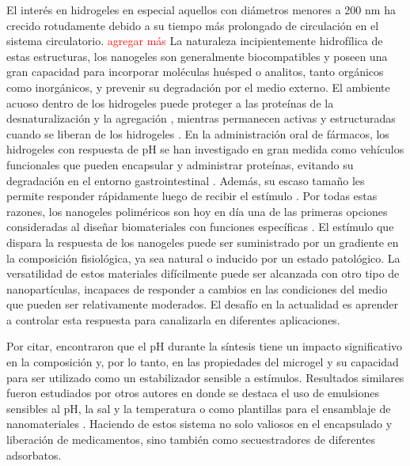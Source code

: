 El inter\'es en hidrogeles en especial aquellos con di\'ametros menores a 200 nm ha crecido rotudamente debido a su tiempo m\'as prolongado de circulaci\'on en el sistema circulatorio. \textcolor{red}{agregar m\'as}
 La naturaleza incipientemente hidrof\'ilica de estas estructuras, los nanogeles son generalmente biocompatibles y poseen una gran capacidad para incorporar mol\'eculas hu\'esped o analitos, tanto org\'anicos como inorg\'anicos, y prevenir su degradaci\'on por el medio externo. El ambiente acuoso dentro de los hidrogeles puede proteger a las prote\'inas de la desnaturalizaci\'on y la agregaci\'on \cite{asayama2008comparison,sawada2010nano,beierle2014polymer}, mientras permanecen activas y estructuradas cuando se liberan de los hidrogeles \cite{vermonden2012hydrogels}. En la administraci\'on oral de f\'armacos, los hidrogeles con respuesta de pH se han investigado en gran medida como veh\'iculos funcionales que pueden encapsular y administrar prote\'inas, evitando su degradaci\'on en el entorno gastrointestinal \cite{malmsten2010biomacromolecules,renukuntla2013approaches,koetting2014ph}.
Adem\'as, su escaso tama\~no les permite responder r\'apidamente luego de recibir el est\'imulo \cite{tanaka1979kinetics} . Por todas estas razones, los nanogeles polim\'ericos son hoy en d\'ia una de las primeras opciones consideradas al dise\~nar biomateriales con funciones espec\'ificas \cite{soni2016nanogels, sabir2019polymeric}. El est\'imulo que dispara la respuesta de los nanogeles puede ser suministrado por un gradiente en la composici\'on fisiol\'ogica, ya sea natural o inducido por un estado patol\'ogico. La versatilidad de estos materiales dif\'icilmente puede ser alcanzada con otro tipo de nanopart\'iculas, incapaces de responder a cambios en las condiciones del medio que pueden ser relativamente moderados. El desaf\'io en la actualidad es aprender a controlar esta respuesta para canalizarla en diferentes aplicaciones.


Por citar, \citet{Brugger2008} encontraron que el pH durante la s\'intesis tiene un impacto significativo en la composici\'on y, por lo tanto, en las propiedades del microgel y su capacidad para ser utilizado como un estabilizador sensible a est\'imulos.
Resultados similares fueron estudiados por otros autores en donde se destaca el uso de emulsiones sensibles al pH, la sal y la temperatura  \cite{Ngai2005,Ngai2006, Schmidt2011} o como plantillas para el ensamblaje de nanomateriales \cite{Wong2009}.
Haciendo de estos sistema no solo valiosos en el encapsulado y liberaci\'on de medicamentos, sino también como secuestradores de diferentes adsorbatos.

